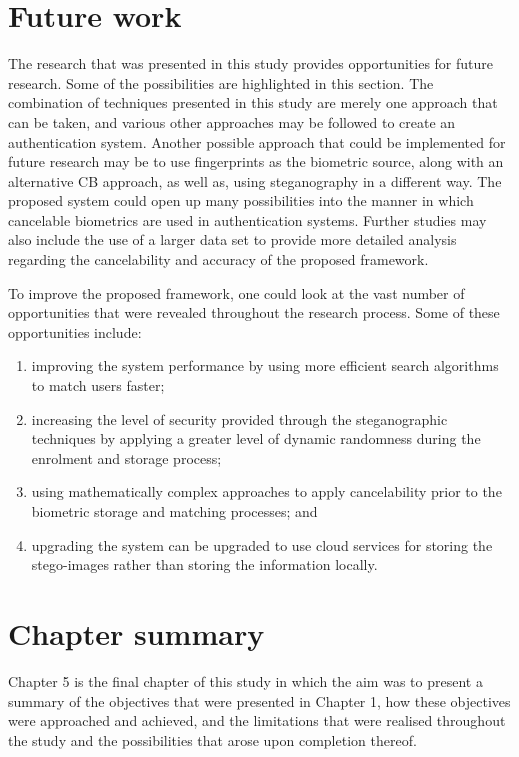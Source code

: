 \section{Future work}
The research that was presented in this study provides opportunities for future research. Some of the possibilities are highlighted in this section.
The combination of techniques presented in this study are merely one approach that can be taken, and various other approaches may be followed to create an authentication system. Another possible approach that could be implemented for future research may be to use fingerprints as the biometric source, along with an alternative CB approach, as well as, using steganography in a different way. The proposed system could open up many possibilities into the manner in which cancelable biometrics are used in authentication systems.
Further studies may also include the use of a larger data set to provide more detailed analysis regarding the cancelability and accuracy of the proposed framework.

To improve the proposed framework, one could look at the vast number of opportunities that were revealed throughout the research process. Some of these opportunities include: 


\begin{enumerate}[label=\roman*.]
    \item improving the system performance by using more efficient search algorithms to match users faster;
    \item increasing the level of security provided through the steganographic techniques by applying a greater level of dynamic randomness during the enrolment and storage process; 
    \item using mathematically complex approaches to apply cancelability prior to the biometric storage and matching processes; and
    \item upgrading the system can be upgraded to use cloud services for storing the stego-images rather than storing the information locally.
\end{enumerate}

\section{Chapter summary}

Chapter 5 is the final chapter of this study in which the aim was to present a summary of the objectives that were presented in Chapter 1, how these objectives were approached and achieved, and the limitations that were realised throughout the study and the possibilities that arose upon completion thereof.